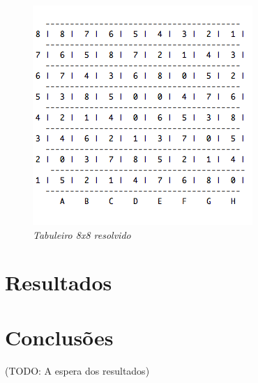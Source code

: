 \documentclass{llncs}
\begin{document}
\begin{figure}[h!]
\begin{center}
\includegraphics[scale=0.6]{tabuleiro.png}
\caption{\textit{Tabuleiro 8x8 resolvido}}
\label{fig:jogo_original}
\end{center}
\end{figure}







\section{Resultados}



\section{Conclus\~{o}es}

(TODO: A espera dos resultados)
\end{document}
